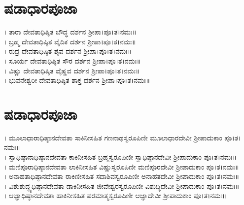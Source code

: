\section{ಷಡಾಧಾರಪೂಜಾ}
। ತಾರಾ ದೇವತಾಧಿಷ್ಠಿತ ಬೌದ್ಧ ದರ್ಶನ ಶ್ರೀಪಾ।ಪೂ।ತ।ನಮಃ॥\\
। ಬ್ರಹ್ಮ ದೇವತಾಧಿಷ್ಠಿತ ವೈದಿಕ ದರ್ಶನ ಶ್ರೀಪಾ।ಪೂ।ತ।ನಮಃ॥\\
 । ರುದ್ರ ದೇವತಾಧಿಷ್ಠಿತ ಶೈವ ದರ್ಶನ ಶ್ರೀಪಾ।ಪೂ।ತ।ನಮಃ॥\\
। ಸೂರ್ಯ ದೇವತಾಧಿಷ್ಠಿತ ಸೌರ ದರ್ಶನ ಶ್ರೀಪಾ।ಪೂ।ತ।ನಮಃ॥\\
। ವಿಷ್ಣು ದೇವತಾಧಿಷ್ಠಿತ ವೈಷ್ಣವ ದರ್ಶನ ಶ್ರೀಪಾ।ಪೂ।ತ।ನಮಃ॥\\
। ಭುವನೇಶ್ವರೀ ದೇವತಾಧಿಷ್ಠಿತ ಶಾಕ್ತ ದರ್ಶನ ಶ್ರೀಪಾ।ಪೂ।ತ।ನಮಃ॥
\section{ಷಡಾಧಾರಪೂಜಾ}
। ಮೂಲಾಧಾರಾಧಿಷ್ಠಾನದೇವತಾ ಸಾಕಿನೀಸಹಿತ ಗಣನಾಥಸ್ವರೂಪಿಣೀ  ಮೂಲಾಧಾರದೇವೀ ಶ್ರೀಪಾದುಕಾಂ ಪೂ।ತ।ನಮಃ॥\\
। ಸ್ವಾಧಿಷ್ಠಾನಾಧಿಷ್ಠಾನದೇವತಾ  ಕಾಕಿನೀಸಹಿತ  ಬ್ರಹ್ಮಸ್ವರೂಪಿಣೀ ಸ್ವಾಧಿಷ್ಠಾನದೇವೀ ಶ್ರೀಪಾದುಕಾಂ ಪೂ।ತ।ನಮಃ॥\\
। ಮಣಿಪೂರಾಧಿಷ್ಠಾನದೇವತಾ ಲಾಕಿನೀಸಹಿತ ವಿಷ್ಣುಸ್ವರೂಪಿಣೀ ಮಣಿಪೂರದೇವೀ ಶ್ರೀಪಾದುಕಾಂ ಪೂ।ತ।ನಮಃ॥\\
। ಅನಾಹತಾಧಿಷ್ಠಾನದೇವತಾ ರಾಕಿಣೀಸಹಿತ ಸದಾಶಿವಸ್ವರೂಪಿಣೀ ಅನಾಹತದೇವೀ ಶ್ರೀಪಾದುಕಾಂ ಪೂ।ತ।ನಮಃ॥\\
। ವಿಶುಶುದ್ಧ್ಯಧಿಷ್ಠಾನದೇವತಾ ಡಾಕಿನೀಸಹಿತ ಜೀವೇಶ್ವರಸ್ವರೂಪಿಣೀ ವಿಶುದ್ಧಿದೇವೀ ಶ್ರೀಪಾದುಕಾಂ ಪೂ।ತ।ನಮಃ॥\\
। ಆಜ್ಞಾಧಿಷ್ಠಾನದೇವತಾ ಹಾಕಿನೀಸಹಿತ ಪರಮಾತ್ಮಸ್ವರೂಪಿಣೀ ಆಜ್ಞಾದೇವೀ ಶ್ರೀಪಾದುಕಾಂ ಪೂ।ತ।ನಮಃ॥
